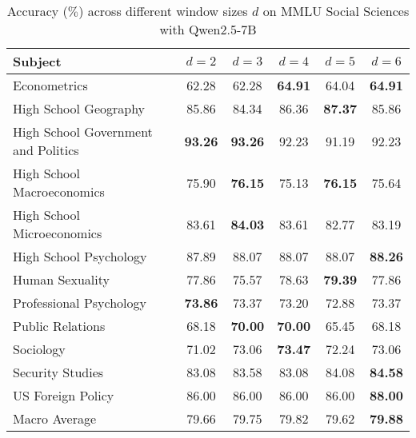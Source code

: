 \begin{table*}[h]
    \centering
    \caption{Accuracy ($\%$) across different window sizes $d$ on MMLU Social Sciences with Qwen2.5-7B}
    \label{tab:qwen_mmlu_social_science_per_d}
    \begin{tabular}{lccccc}
        \toprule
        \textbf{Subject}                    & $d=2$   & $d=3$   & $d=4$   & $d=5$   & $d=6$   \\
        \midrule
        Econometrics                        & 62.28          & 62.28          & \textbf{64.91} & 64.04          & \textbf{64.91} \\
        High School Geography               & 85.86          & 84.34          & 86.36          & \textbf{87.37} & 85.86          \\
        High School Government and Politics & \textbf{93.26} & \textbf{93.26} & 92.23          & 91.19          & 92.23          \\
        High School Macroeconomics          & 75.90          & \textbf{76.15} & 75.13          & \textbf{76.15} & 75.64          \\
        High School Microeconomics          & 83.61          & \textbf{84.03} & 83.61          & 82.77          & 83.19          \\
        High School Psychology              & 87.89          & 88.07          & 88.07          & 88.07          & \textbf{88.26} \\
        Human Sexuality                     & 77.86          & 75.57          & 78.63          & \textbf{79.39} & 77.86          \\
        Professional Psychology             & \textbf{73.86} & 73.37          & 73.20          & 72.88          & 73.37          \\
        Public Relations                    & 68.18          & \textbf{70.00} & \textbf{70.00} & 65.45          & 68.18          \\
        Sociology                           & 71.02          & 73.06          & \textbf{73.47} & 72.24          & 73.06          \\
        Security Studies                    & 83.08          & 83.58          & 83.08          & 84.08          & \textbf{84.58} \\
        US Foreign Policy                   & 86.00          & 86.00          & 86.00          & 86.00          & \textbf{88.00} \\
        \midrule
        Macro Average                       & 79.66          & 79.75          & 79.82          & 79.62          & \textbf{79.88} \\
        \bottomrule
    \end{tabular}
\end{table*}


